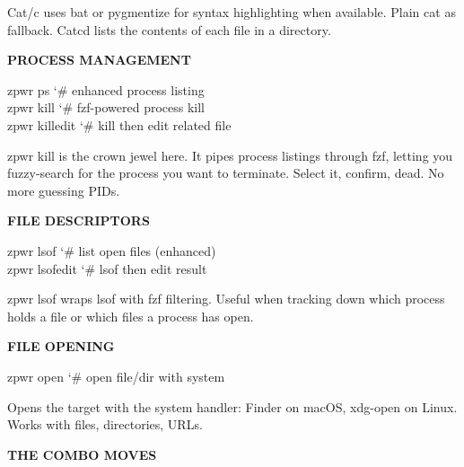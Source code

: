 \documentclass[11pt,a4paper,twoside]{book}
\begin{document}
Cat/c uses bat or pygmentize for syntax highlighting when available. Plain cat as fallback. Catcd lists the contents of each file in a directory.


\vspace{12pt}
{\bfseries\color{neonyellow} PROCESS MANAGEMENT}\vspace{4pt}

\begin{codebox}
\color{neongreen}zpwr ps                             {\char`\#} enhanced process listing\\
\color{neongreen}zpwr kill                           {\char`\#} fzf-powered process kill\\
\color{neongreen}zpwr killedit                       {\char`\#} kill then edit related file\\
\end{codebox}

zpwr kill is the crown jewel here. It pipes process listings through fzf, letting you fuzzy-search for the process you want to terminate. Select it, confirm, dead. No more guessing PIDs.


\vspace{12pt}
{\bfseries\color{neonyellow} FILE DESCRIPTORS}\vspace{4pt}

\begin{codebox}
\color{neongreen}zpwr lsof                           {\char`\#} list open files (enhanced)\\
\color{neongreen}zpwr lsofedit                       {\char`\#} lsof then edit result\\
\end{codebox}

zpwr lsof wraps lsof with fzf filtering. Useful when tracking down which process holds a file or which files a process has open.


\vspace{12pt}
{\bfseries\color{neonyellow} FILE OPENING}\vspace{4pt}

\begin{codebox}
\color{neongreen}zpwr open                           {\char`\#} open file/dir with system\\
\end{codebox}

Opens the target with the system handler: Finder on macOS, xdg-open on Linux. Works with files, directories, URLs.


\vspace{12pt}
{\bfseries\color{neonyellow} THE COMBO MOVES}\vspace{4pt}
\end{document}
